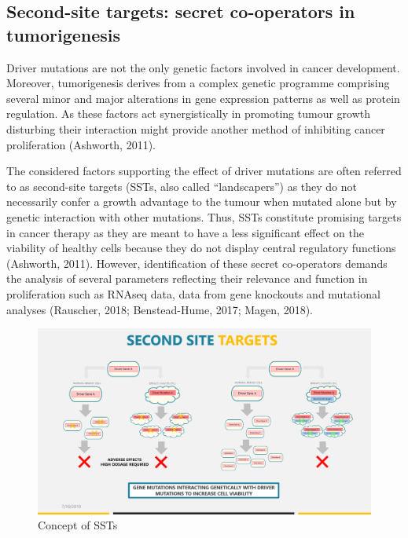 \documentclass[]{article}
\begin{document}
\hypertarget{second-site-targets-secret-co-operators-in-tumorigenesis}{%
\subsection{Second-site targets: secret co-operators in
tumorigenesis}\label{second-site-targets-secret-co-operators-in-tumorigenesis}}

Driver mutations are not the only genetic factors involved in cancer
development. Moreover, tumorigenesis derives from a complex genetic
programme comprising several minor and major alterations in gene
expression patterns as well as protein regulation. As these factors act
synergistically in promoting tumour growth disturbing their interaction
might provide another method of inhibiting cancer proliferation
(Ashworth, 2011).

The considered factors supporting the effect of driver mutations are
often referred to as second-site targets (SSTs, also called
``landscapers'') as they do not necessarily confer a growth advantage to
the tumour when mutated alone but by genetic interaction with other
mutations. Thus, SSTs constitute promising targets in cancer therapy as
they are meant to have a less significant effect on the viability of
healthy cells because they do not display central regulatory functions
(Ashworth, 2011). However, identification of these secret co-operators
demands the analysis of several parameters reflecting their relevance
and function in proliferation such as RNAseq data, data from gene
knockouts and mutational analyses (Rauscher, 2018; Benstead-Hume, 2017;
Magen, 2018).

\begin{figure}

{\centering \includegraphics[width=1\linewidth]{Concept_of_SSTs} 

}

\caption{Concept of SSTs}\label{fig:SSTs}
\end{figure}
\end{document}
